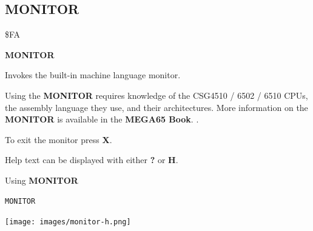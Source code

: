 \subsection{MONITOR}
\begin{description}[leftmargin=2cm,style=nextline]
\item [Token:]    \$FA

\item [Format:]   {\bf MONITOR}

\item [Usage:]    Invokes the built-in machine language monitor.

\item [Remarks:]  Using the {\bf MONITOR} requires knowledge of the CSG4510 / 6502 / 6510 CPUs, the assembly language they use, and their architectures. More information on the {\bf MONITOR} is available in \ifdefined\printmanual
                     the {\bf MEGA65 Book}.
                  \else
                     .
                  \fi

                  To exit the monitor press {\bf X}.

                  Help text can be displayed with either {\bf ?} or {\bf H}.

\item [Example:]  Using {\bf MONITOR}

\begin{tcolorbox}[colback=black,coltext=white]
\verbatimfont{\codefont}
\begin{verbatim}
MONITOR
\end{verbatim}
\end{tcolorbox}

\item \begin{center}\texttt{[image: images/monitor-h.png]}\end{center}
\item 
\end{description}


\newpage
